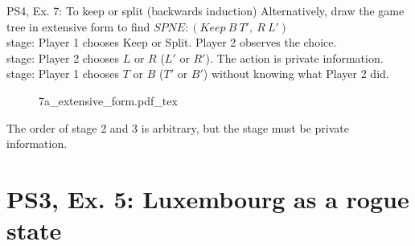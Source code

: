 \begin{frame}{PS4, Ex. 7: To keep or split (backwards induction)}
  Alternatively, draw the game tree in extensive form to find $SPNE:(Keep\ B\ T',\ R\ L')$\\\medskip
   stage: Player 1 chooses Keep or Split. Player 2 observes the choice.\\\medskip
   stage: Player 2 chooses $L$ or $R$ ($L'$ or $R'$). The action is private information.\\\medskip
   stage: Player 1 chooses $T$ or $B$ ($T'$ or $B'$) without knowing what Player 2 did.\\\medskip
  \begin{figure}[!h]
    \begin{center}
    \def\svgwidth{\columnwidth}
    {7a_extensive_form.pdf_tex}
    \end{center}
  \end{figure}
  \vspace{-8pt}
  The order of stage 2 and 3 is arbitrary, but the  stage must be private information.
\end{frame}


\section{PS3, Ex. 5: Luxembourg as a rogue state}

